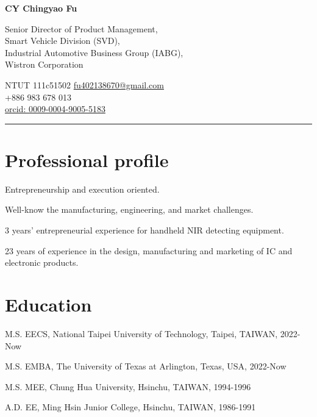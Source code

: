 \documentclass[12pt,a4paper]{report}
\newcommand{\myname}{CY Chingyao Fu}
\newcommand{\namefont}[1]{{\normalfont\bfseries\Huge{#1}}}
\begin{document}
    \raggedright{}

    \namefont{\myname}

    \vspace{1em}
    \begin{minipage}[t]{0.7\textwidth}
        Senior Director of Product Management,\\
        Smart Vehicle Division (SVD),\\
        Industrial Automotive Business Group (IABG),\\
        Wistron Corporation
    \end{minipage}
    \begin{minipage}[t]{0.295\textwidth}
        \flushright{}
        NTUT 111c51502
        \href{mailto:fu402138670@gmail.com}{fu402138670@gmail.com} \\
        +886 983 678 013 \\
        \href{https://orcid.org/0009-0004-9005-5183}{orcid: 0009-0004-9005-5183}\\
    \end{minipage}
    \vspace{1em}
    \hrule
    
    \section*{Professional profile}
        \begin{tablist}
        \item Entrepreneurship and execution oriented. 
        \item Well-know the manufacturing, engineering, and market challenges. 
        \item 3 years’ entrepreneurial experience for handheld NIR detecting equipment. 
        \item 23 years of experience in the design, manufacturing and marketing of IC and electronic products. 
        \end{tablist}
    
    \section*{Education}
    
    \begin{tablist}
      \item[M.S.] \tab{}EECS, National Taipei University of Technology, Taipei, TAIWAN, 2022-Now
      \item[M.S.] \tab{}EMBA, The University of Texas at Arlington, Texas, USA, 2022-Now
      \item[M.S.] \tab{}MEE, Chung Hua University, Hsinchu, TAIWAN, 1994-1996
      \item[A.D.] \tab{}EE, Ming Hsin Junior College, Hsinchu, TAIWAN, 1986-1991
    \end{tablist}
\end{document}
